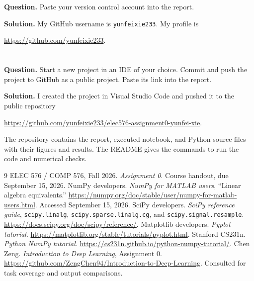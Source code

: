 \documentclass[11pt]{article}
\newcommand{\solution}{\par\medskip\noindent\textbf{Solution.}\enspace\ignorespaces}
\begin{document}
\clearpage
\section*{}
\textbf{Question.}
Paste your version control account into the report.

\solution
My GitHub username is \texttt{yunfeixie233}. My profile is
\begin{center}
\url{https://github.com/yunfeixie233}.
\end{center}

\section*{}
\textbf{Question.}
Start a new project in an IDE of your choice. Commit and push the
project to GitHub as a public project. Paste its link into the report.

\solution
I created the project in Visual Studio Code and pushed it to the
public repository
\begin{center}
\url{https://github.com/yunfeixie233/elec576-assignment0-yunfei-xie}.
\end{center}
The repository contains the report, executed notebook, and Python
source files with their figures and results. The README gives the
commands to run the code and numerical checks.

\begin{thebibliography}{9}
ELEC 576 / COMP 576, Fall 2026. \emph{Assignment 0}.
Course handout, due September 15, 2026.
NumPy developers. \emph{NumPy for MATLAB users},
``Linear algebra equivalents.''
\url{https://numpy.org/doc/stable/user/numpy-for-matlab-users.html}.
Accessed September 15, 2026.
SciPy developers. \emph{SciPy reference guide},
\texttt{scipy.linalg}, \texttt{scipy.sparse.linalg.cg}, and
\texttt{scipy.signal.resample}.
\url{https://docs.scipy.org/doc/scipy/reference/}.
Matplotlib developers. \emph{Pyplot tutorial}.
\url{https://matplotlib.org/stable/tutorials/pyplot.html}.
Stanford CS231n. \emph{Python NumPy tutorial}.
\url{https://cs231n.github.io/python-numpy-tutorial/}.
Chen Zeng. \emph{Introduction to Deep Learning}, Assignment 0.
\url{https://github.com/ZengChen94/Introduction-to-Deep-Learning}.
Consulted for task coverage and output comparisons.
\end{thebibliography}
\end{document}
